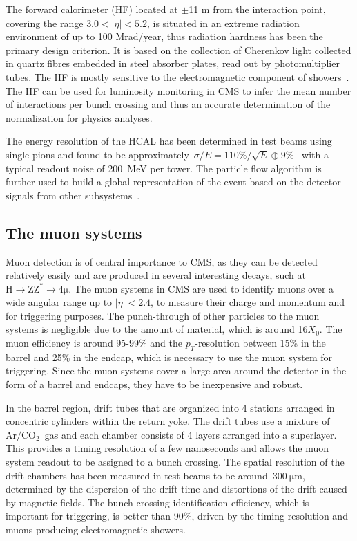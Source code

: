 The forward calorimeter (HF) located at $\pm$11 m from the interaction point, covering the range $3.0 < |\eta| < 5.2$, is situated in an extreme radiation environment of up to 100 Mrad/year, thus radiation hardness has been the primary design criterion. It is based on the collection of Cherenkov light collected in quartz fibres embedded in steel absorber plates, read out by photomultiplier tubes. The HF is mostly sensitive to the electromagnetic component of showers~\cite{Akchurin:2003tp}. The HF can be used for luminosity monitoring in CMS to infer the mean number of interactions per bunch crossing and thus an accurate determination of the normalization for physics analyses.

The energy resolution of the HCAL has been determined in test beams using single pions and found to be approximately~$\sigma/E = 110\%/\sqrt{E} \oplus 9\%$~\cite{Elvira:2004iya} with a typical readout noise of 200~MeV per tower. The particle flow algorithm is further used to build a global representation of the event based on the detector signals from other subsystems~\cite{CMS-PRF-14-001}.

\subsection{The muon systems}
Muon detection is of central importance to CMS, as they can be detected relatively easily and are produced in several interesting decays, such at $\mathrm{H} \rightarrow \mathrm{Z} \mathrm{Z}^* \rightarrow 4 \mathrm{\mu}$. The muon systems in CMS are used to identify muons over a wide angular range up to $|\eta| < 2.4$, to measure their charge and momentum and for triggering purposes. The punch-through of other particles to the muon systems is negligible due to the amount of material, which is around 16$X_0$. The muon efficiency is around 95-99\% and the $p_T$-resolution between 15\% in the barrel and 25\% in the endcap, which is necessary to use the muon system for triggering. Since the muon systems cover a large area around the detector in the form of a barrel and endcaps, they have to be inexpensive and robust.

In the barrel region, drift tubes that are organized into 4 stations arranged in concentric cylinders within the return yoke. The drift tubes use a mixture of~$\mathrm{Ar}/\mathrm{CO}_2$~gas and each chamber consists of 4 layers arranged into a superlayer. This provides a timing resolution of a few nanoseconds and allows the muon system readout to be assigned to a bunch crossing. The spatial resolution of the drift chambers has been measured in test beams to be around~$300~\mathrm{\mu m}$, determined by the dispersion of the drift time and distortions of the drift caused by magnetic fields. The bunch crossing identification efficiency, which is important for triggering, is better than 90\%, driven by the timing resolution and muons producing electromagnetic showers.


